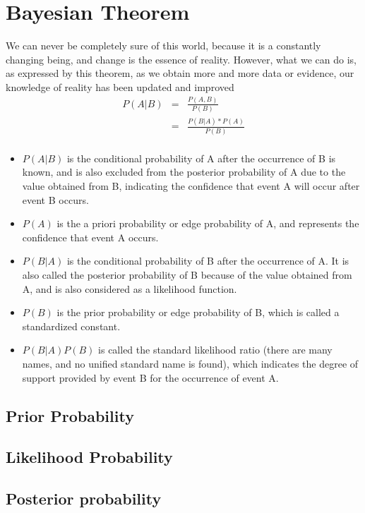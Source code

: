\section{Bayesian Theorem}\label{Banach Spaces}
We can never be completely sure of this world, because it is a constantly changing being, and change is the essence of reality. However, what we can do is, as expressed by this theorem, as we obtain more and more data or evidence, our knowledge of reality has been updated and improved
\begin{eqnarray*}
P(A|B) &=& \frac{P(A,B)}{P(B)} \\
& = &\frac{P(B|A)*P(A)}{P(B)} \\
\end{eqnarray*}
\begin{itemize}
  \item $P(A | B)$ is the conditional probability of A after the occurrence of B is known, and is also excluded from the posterior probability of A due to the value obtained from B, indicating the confidence that event A will occur after event B occurs.

  \item $P(A)$ is the a priori probability or edge probability of A, and represents the confidence that event A occurs.

  \item $P(B|A)$ is the conditional probability of B after the occurrence of A. It is also called the posterior probability of B because of the value obtained from A, and is also considered as a likelihood function.

  \item $P(B)$ is the prior probability or edge probability of B, which is called a standardized constant.

  \item $P(B | A) P(B)$ is called the standard likelihood ratio (there are many names, and no unified standard name is found), which indicates the degree of support provided by event B for the occurrence of event A.
\end{itemize}
\subsection{Prior Probability}

\subsection{Likelihood Probability}

\subsection{Posterior probability}
